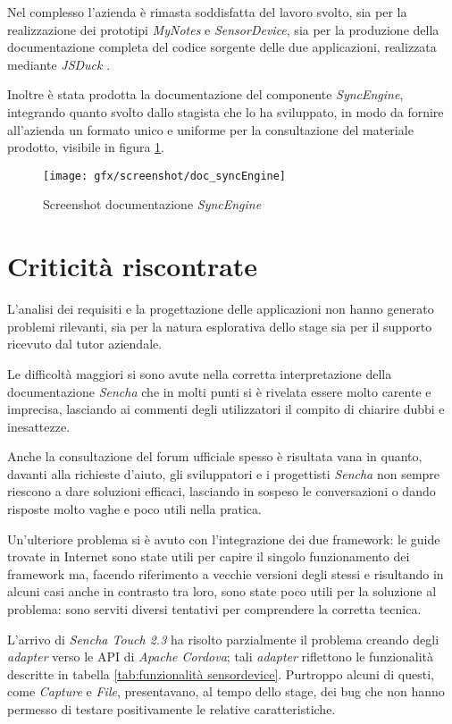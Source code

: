 Nel complesso l'azienda è rimasta soddisfatta del lavoro svolto, sia per la realizzazione dei prototipi \emph{MyNotes} e \emph{SensorDevice}, sia per la produzione della documentazione completa del codice sorgente delle due applicazioni, realizzata mediante \emph{JSDuck} \cite{sencha:jsduck}.

Inoltre è stata prodotta la documentazione del componente \emph{SyncEngine}, integrando quanto svolto dallo stagista che lo ha sviluppato, in modo da fornire all'azienda un formato unico e uniforme per la consultazione del materiale prodotto, visibile in figura \ref{fig:documentazione syncengine}.

\begin{figure}[htb]
\centering
\texttt{[image: gfx/screenshot/doc\_syncEngine]}
\caption{Screenshot documentazione \emph{SyncEngine}}
\label{fig:documentazione syncengine}
\end{figure}

\section{Criticità riscontrate}
L'analisi dei requisiti e la progettazione delle applicazioni non hanno generato problemi rilevanti, sia per la natura esplorativa dello stage sia per il supporto ricevuto dal tutor aziendale.

Le difficoltà maggiori si sono avute nella corretta interpretazione della documentazione \emph{Sencha} che in molti punti si è rivelata essere molto carente e imprecisa, lasciando ai commenti degli utilizzatori il compito di chiarire dubbi e inesattezze.

Anche la consultazione del forum ufficiale spesso è risultata vana in quanto, davanti alla richieste d'aiuto, gli sviluppatori e i progettisti \emph{Sencha} non sempre riescono a dare soluzioni efficaci, lasciando in sospeso le conversazioni o dando risposte molto vaghe e poco utili nella pratica.

Un'ulteriore problema si è avuto con l'integrazione dei due framework: le guide trovate in Internet sono state utili per capire il singolo funzionamento dei framework ma, facendo riferimento a vecchie versioni degli stessi e risultando in alcuni casi anche in contrasto tra loro, sono state poco utili per la soluzione al problema: sono serviti diversi tentativi per comprendere la corretta tecnica.

L'arrivo di \emph{Sencha Touch 2.3} ha risolto parzialmente il problema creando degli \emph{adapter} verso le \ac{API} di \emph{Apache Cordova}; tali \emph{adapter} riflettono le funzionalità descritte in tabella \ref{tab:funzionalità sensordevice}. Purtroppo alcuni di questi, come \emph{Capture} e \emph{File}, presentavano, al tempo dello stage, dei bug che non hanno permesso di testare positivamente le relative caratteristiche.

